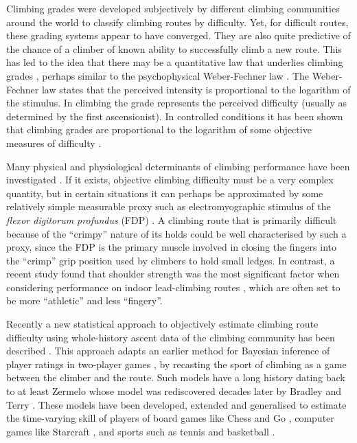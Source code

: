 \documentclass{article}
\begin{document}
Climbing grades were developed subjectively by different climbing communities around the world to classify climbing routes by difficulty. Yet, for difficult routes, these grading systems appear to have converged. They are also quite predictive of the chance of a climber of known ability to successfully climb a new route. This has led to the idea that there may be a quantitative law that underlies climbing grades \cite{delignieres1993psychophysical}, perhaps similar to the psychophysical Weber-Fechner law \cite{1834pulsu,fechner1860}. The Weber-Fechner law states that the perceived intensity is proportional to the logarithm of the stimulus. In climbing the grade represents the perceived difficulty (usually as determined by the first ascensionist). In controlled conditions it has been shown that climbing grades are proportional to the logarithm of some objective measures of difficulty \cite{delignieres1993psychophysical}. 

Many physical and physiological determinants of climbing performance have been investigated \cite{balavs2012hand, balavs2014relationship, mackenzie2020physical}. If it exists, objective climbing difficulty must be a very complex quantity, but in certain situations it can perhaps be approximated by some relatively simple measurable proxy such as electromyographic stimulus of the {\it flexor digitorum profundus} (FDP) \cite{delignieres1993psychophysical}. A climbing route that is primarily difficult because of the ``crimpy'' nature of its holds could be well characterised by such a proxy, since the FDP is the primary muscle involved in closing the fingers into the ``crimp'' grip position used by climbers to hold small ledges. In contrast, a recent study found that shoulder strength was the most significant factor when considering performance on indoor lead-climbing routes \cite{mackenzie2020physical}, which are often set to be more ``athletic'' and less ``fingery''.

Recently a new statistical approach to objectively estimate climbing route difficulty using whole-history ascent data of the climbing community has been described \cite{scarff2020estimation}. This approach adapts an earlier method for Bayesian inference of player ratings in two-player games \cite{coulom2008whole}, by recasting the sport of climbing as a game between the climber and the route. Such models have a long history dating back to at least Zermelo \cite{zermelo1929berechnung} whose model was rediscovered decades later by Bradley and Terry \cite{bradley1952rank}. These models have been developed, extended and generalised to estimate the time-varying skill of players of board games like Chess \cite{Elo1978, glickman1999rating} and Go \cite{coulom2008whole}, computer games like Starcraft \cite{maystre2019pairwise}, and sports such as tennis \cite{maystre2019pairwise} and basketball \cite{maystre2019pairwise}.
\end{document}
